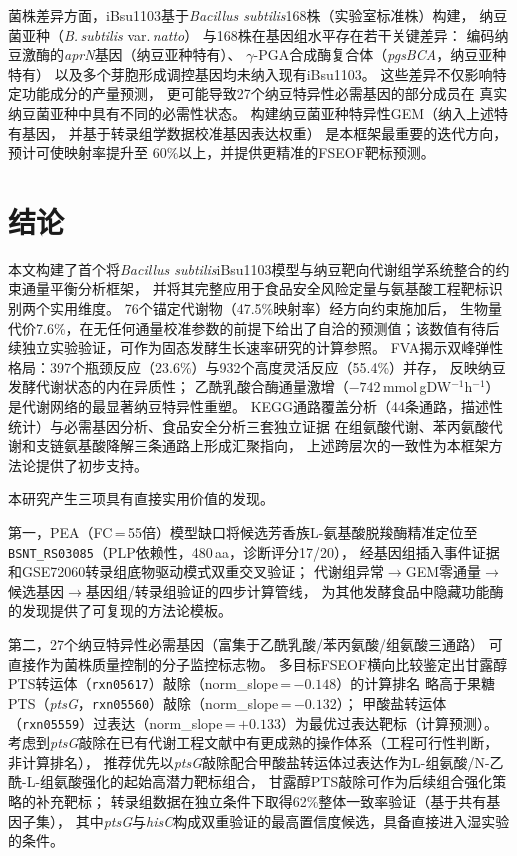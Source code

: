 \documentclass[10pt, a4paper, twocolumn]{ctexart}
\newcommand{\ibsu}{iBsu1103}
\newcommand{\bs}{\textit{Bacillus subtilis}}
\newcommand{\mmolg}{mmol\,gDW$^{-1}$h$^{-1}$}
\newcommand{\NAH}{N-乙酰-L-组氨酸}
\begin{document}
菌株差异方面，\ibsu{}基于\bs{}168株（实验室标准株）构建，
纳豆菌亚种（\textit{B.\,subtilis} var.\,\textit{natto}）
与168株在基因组水平存在若干关键差异：
编码纳豆激酶的\textit{aprN}基因（纳豆亚种特有）、
$\gamma$-PGA合成酶复合体（\textit{pgsBCA}，纳豆亚种特有）
以及多个芽胞形成调控基因均未纳入现有\ibsu{}。
这些差异不仅影响特定功能成分的产量预测，
更可能导致27个纳豆特异性必需基因的部分成员在
真实纳豆菌亚种中具有不同的必需性状态。
构建纳豆菌亚种特异性GEM（纳入上述特有基因，
并基于转录组学数据校准基因表达权重）
是本框架最重要的迭代方向，预计可使映射率提升至
60\%以上，并提供更精准的FSEOF靶标预测。

\section{结论}

本文构建了首个将\bs{}\ibsu{}模型与纳豆靶向代谢组学系统整合的约束通量平衡分析框架，
并将其完整应用于食品安全风险定量与氨基酸工程靶标识别两个实用维度。
76个锚定代谢物（47.5\%映射率）经方向约束施加后，
生物量代价7.6\%，在无任何通量校准参数的前提下给出了自洽的预测值；该数值有待后续独立实验验证，可作为固态发酵生长速率研究的计算参照。
FVA揭示双峰弹性格局：397个瓶颈反应（23.6\%）与932个高度灵活反应（55.4\%）并存，
反映纳豆发酵代谢状态的内在异质性；
乙酰乳酸合酶通量激增（$-742$\,\mmolg{}）是代谢网络的最显著纳豆特异性重塑。
KEGG通路覆盖分析（44条通路，描述性统计）与必需基因分析、食品安全分析三套独立证据
在组氨酸代谢、苯丙氨酸代谢和支链氨基酸降解三条通路上形成汇聚指向，
上述跨层次的一致性为本框架方法论提供了初步支持。

本研究产生三项具有直接实用价值的发现。

第一，PEA（FC\,=\,55倍）模型缺口将候选芳香族L-氨基酸脱羧酶精准定位至
\texttt{BSNT\_RS03085}（PLP依赖性，480\,aa，诊断评分17/20），
经基因组插入事件证据和GSE72060转录组底物驱动模式双重交叉验证；
代谢组异常$\to$GEM零通量$\to$候选基因$\to$基因组/转录组验证的四步计算管线，
为其他发酵食品中隐藏功能酶的发现提供了可复现的方法论模板。

第二，27个纳豆特异性必需基因（富集于乙酰乳酸/苯丙氨酸/组氨酸三通路）
可直接作为菌株质量控制的分子监控标志物。
多目标FSEOF横向比较鉴定出甘露醇PTS转运体（\texttt{rxn05617}）敲除（norm\_slope\,=\,$-0.148$）的计算排名
略高于果糖PTS（\textit{ptsG}，\texttt{rxn05560}）敲除（norm\_slope\,=\,$-0.132$）；
甲酸盐转运体（\texttt{rxn05559}）过表达（norm\_slope\,=\,$+0.133$）为最优过表达靶标（计算预测）。
考虑到\textit{ptsG}敲除在已有代谢工程文献中有更成熟的操作体系（工程可行性判断，非计算排名），
推荐优先以\textit{ptsG}敲除配合甲酸盐转运体过表达作为L-组氨酸/\NAH{}强化的起始高潜力靶标组合，
甘露醇PTS敲除可作为后续组合强化策略的补充靶标；
转录组数据在独立条件下取得62\%整体一致率验证（基于共有基因子集），
其中\textit{ptsG}与\textit{hisC}构成双重验证的最高置信度候选，具备直接进入湿实验的条件。
\end{document}
